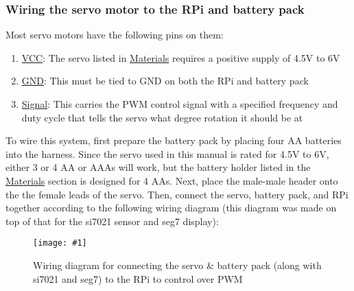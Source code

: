 \documentclass{article}
\newcommand{\imagefigb}[2]{
    \begin{figure}[H]
        \centering
        \texttt{[image: \#1]}
        \caption{#2}
    \end{figure}
}
\begin{document}
    \subsubsection{Wiring the servo motor to the RPi and battery pack}
    Most servo motors have the following pins on them:
    \begin{enumerate}
      \item \underline{VCC}: The servo listed in \hyperref[sec:materials]{Materials} requires a positive supply of 4.5V to 6V
      \item \underline{GND}: This must be tied to GND on both the RPi and battery pack
      \item \underline{Signal}: This carries the PWM control signal with a specified frequency and duty cycle that tells the servo what degree rotation it should be at
    \end{enumerate}
    To wire this system, first prepare the battery pack by placing four AA batteries into the harness. Since the servo used in this manual is rated for 4.5V to 6V, either 3 or 4 AA or AAAs will work, but the battery holder listed in the \hyperref[sec:materials]{Materials} section is designed for 4 AAs.
    \newline
    \indent
    Next, place the male-male header onto the the female leads of the servo. Then, connect the servo, battery pack, and RPi together according to the following wiring diagram (this diagram was made on top of that for the si7021 sensor and seg7 display):
    \imagefigb{si7021-seg7-servo-wiring-diagram.png}{Wiring diagram for connecting the servo \& battery pack (along with si7021 and seg7) to the RPi to control over PWM}
\end{document}

